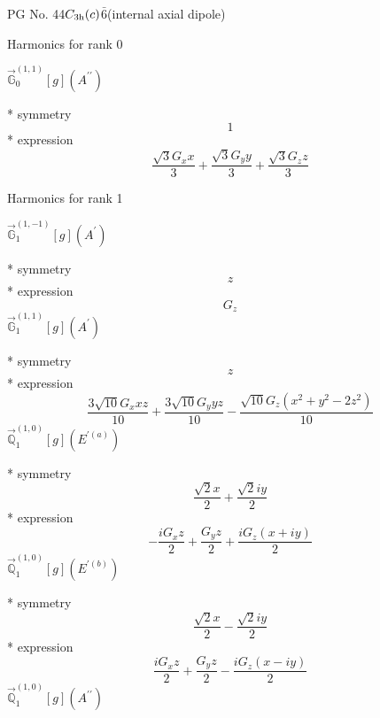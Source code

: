 \documentclass[fleqn,8pt]{jsarticle}
\begin{document}
\setcounter{MaxMatrixCols}{32}

\renewcommand{\tablename}{Table~}
\renewcommand{\figurename}{Figure~}
\begin{center}
\LARGE
PG No. 44\quad$C_{\rm 3h}(c)$\quad$\bar{6}$\quad[ hexagonal ] (internal axial dipole)
\end{center}

\noindent * Harmonics for rank 0

\noindent\quad $\vec{\mathbb{G}}_{0}^{(1,1)}[g](A^{\prime\prime})$

\noindent\quad ** symmetry
\begin{dmath*}
1
\end{dmath*}
\noindent\quad ** expression
\begin{dmath*}
\frac{\sqrt{3} G_{x} x}{3} + \frac{\sqrt{3} G_{y} y}{3} + \frac{\sqrt{3} G_{z} z}{3}
\end{dmath*}

\noindent * Harmonics for rank 1

\noindent\quad $\vec{\mathbb{G}}_{1}^{(1,-1)}[g](A^{\prime})$

\noindent\quad ** symmetry
\begin{dmath*}
z
\end{dmath*}
\noindent\quad ** expression
\begin{dmath*}
G_{z}
\end{dmath*}
\noindent\quad $\vec{\mathbb{G}}_{1}^{(1,1)}[g](A^{\prime})$

\noindent\quad ** symmetry
\begin{dmath*}
z
\end{dmath*}
\noindent\quad ** expression
\begin{dmath*}
\frac{3 \sqrt{10} G_{x} x z}{10} + \frac{3 \sqrt{10} G_{y} y z}{10} - \frac{\sqrt{10} G_{z} \left(x^{2} + y^{2} - 2 z^{2}\right)}{10}
\end{dmath*}
\noindent\quad $\vec{\mathbb{Q}}_{1}^{(1,0)}[g](E^{\prime(a)})$

\noindent\quad ** symmetry
\begin{dmath*}
\frac{\sqrt{2} x}{2} + \frac{\sqrt{2} i y}{2}
\end{dmath*}
\noindent\quad ** expression
\begin{dmath*}
- \frac{i G_{x} z}{2} + \frac{G_{y} z}{2} + \frac{i G_{z} \left(x + i y\right)}{2}
\end{dmath*}
\noindent\quad $\vec{\mathbb{Q}}_{1}^{(1,0)}[g](E^{\prime(b)})$

\noindent\quad ** symmetry
\begin{dmath*}
\frac{\sqrt{2} x}{2} - \frac{\sqrt{2} i y}{2}
\end{dmath*}
\noindent\quad ** expression
\begin{dmath*}
\frac{i G_{x} z}{2} + \frac{G_{y} z}{2} - \frac{i G_{z} \left(x - i y\right)}{2}
\end{dmath*}
\noindent\quad $\vec{\mathbb{Q}}_{1}^{(1,0)}[g](A^{\prime\prime})$
\end{document}
